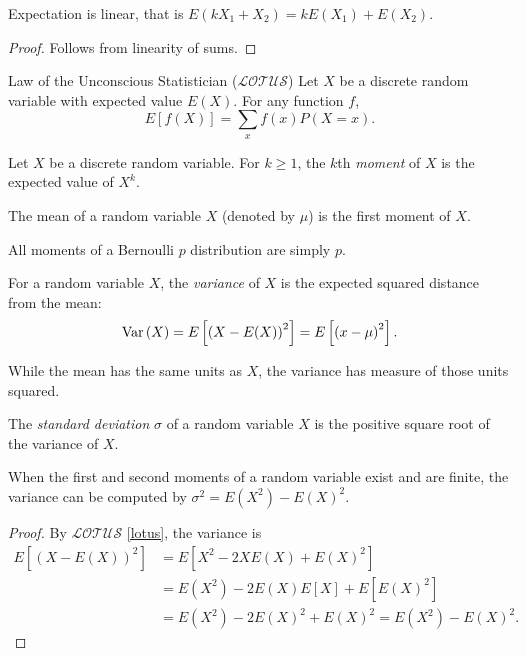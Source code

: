 \begin{prop}
    Expectation is linear, that is $E(kX_1+X_2) = kE(X_1) + E(X_2)$.
\end{prop}

\begin{proof}
    Follows from linearity of sums.
\end{proof}

\begin{thm}{Law of the Unconscious Statistician ($\mathcal{LOTUS}$)}{\label{lotus}}\proofbreak
    Let $X$ be a discrete random variable with expected value $E(X)$. For any function $f$, \[E[f(X)] = \sum_{x}f(x)P(X=x).\]
\end{thm}

\begin{defn}
    Let $X$ be a discrete random variable. For $k \geq 1$, the $k$th \emph{moment} of $X$ is the expected value of $X^k$.
\end{defn}

\begin{rmk}
    The mean of a random variable $X$ (denoted by $\mu$) is the first moment of $X$.
\end{rmk}

\begin{exmp}
    All moments of a Bernoulli $p$ distribution are simply $p$.
\end{exmp}

\begin{defn}
    For a random variable $X$, the \emph{variance} of $X$ is the expected squared distance from the mean: \[\operatorname{Var}\left(X\right) = E\left[\left(X-E(X)\right)^2\right] = E\left[\left(x - \mu\right)^2\right].\]
\end{defn}

\begin{rmk}
    While the mean has the same units as $X$, the variance has measure of those units squared.
\end{rmk}

\begin{defn}
    The \emph{standard deviation} $\sigma$ of a random variable $X$ is the positive square root of the variance of $X$.
\end{defn}

\begin{prop}
    When the first and second moments of a random variable exist and are finite, the variance can be computed by $\sigma^2 = E(X^2) - E(X)^2$.
\end{prop}

\begin{proof}
    By $\mathcal{LOTUS}$ \ref{lotus}, the variance is
    \begin{align*}
        E\left[(X-E(X))^2\right] &= E\left[X^2 - 2XE(X) + E(X)^2\right] \\
        &= E(X^2) - 2E(X)E\left[X\right] + E\left[E(X)^2\right] \\
        &= E(X^2) - 2E(X)^2 + E(X)^2 = E(X^2) - E(X)^2.
    \end{align*}
\end{proof}

